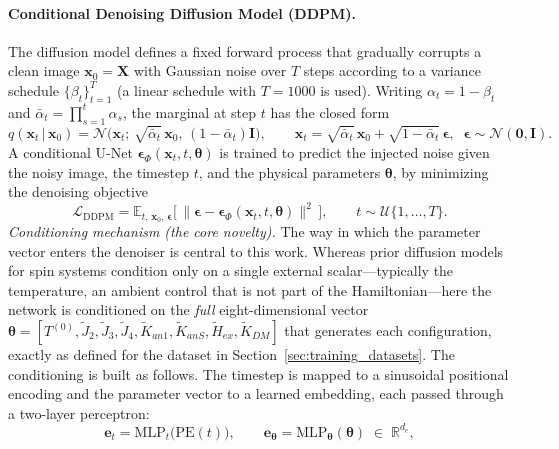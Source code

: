 \documentclass[letterpaper, 12, one column]{article}
\begin{document}
\paragraph{Conditional Denoising Diffusion Model (DDPM).}
The diffusion model defines a fixed forward process that gradually corrupts a clean image $\mathbf{x}_0=\mathbf{X}$ with Gaussian noise over $T$ steps according to a variance schedule $\{\beta_t\}_{t=1}^{T}$ (a linear schedule with $T=1000$ is used). Writing $\alpha_t = 1-\beta_t$ and $\bar{\alpha}_t = \prod_{s=1}^{t}\alpha_s$, the marginal at step $t$ has the closed form
\begin{equation}
q(\mathbf{x}_t\,|\,\mathbf{x}_0) = \mathcal{N}\!\big(\mathbf{x}_t;\,\sqrt{\bar{\alpha}_t}\,\mathbf{x}_0,\,(1-\bar{\alpha}_t)\mathbf{I}\big),\qquad
\mathbf{x}_t = \sqrt{\bar{\alpha}_t}\,\mathbf{x}_0 + \sqrt{1-\bar{\alpha}_t}\,\boldsymbol{\epsilon},\;\;\boldsymbol{\epsilon}\sim\mathcal{N}(\mathbf{0},\mathbf{I}).
\label{eq:ddpm_forward}
\end{equation}
A conditional U-Net $\boldsymbol{\epsilon}_{\Phi}(\mathbf{x}_t,t,\boldsymbol{\theta})$ is trained to predict the injected noise given the noisy image, the timestep $t$, and the physical parameters $\boldsymbol{\theta}$, by minimizing the denoising objective
\begin{equation}
\mathcal{L}_{\mathrm{DDPM}} = \mathbb{E}_{t,\,\mathbf{x}_0,\,\boldsymbol{\epsilon}}\Big[\,\big\lVert \boldsymbol{\epsilon} - \boldsymbol{\epsilon}_{\Phi}(\mathbf{x}_t,t,\boldsymbol{\theta})\big\rVert^2\,\Big],\qquad t\sim\mathcal{U}\{1,\dots,T\}.
\label{eq:ddpm_loss}
\end{equation}
\emph{Conditioning mechanism (the core novelty).} The way in which the parameter vector enters the denoiser is central to this work. Whereas prior diffusion models for spin systems condition only on a single external scalar---typically the temperature, an ambient control that is not part of the Hamiltonian---here the network is conditioned on the \emph{full} eight-dimensional vector $\boldsymbol{\theta}=[T^{(0)},\tilde{J}_2,\tilde{J}_3,\tilde{J}_4,\tilde{K}_{an1},\tilde{K}_{anS},\tilde{H}_{ex},\tilde{K}_{DM}]$ that generates each configuration, exactly as defined for the dataset in Section~\ref{sec:training_datasets}. The conditioning is built as follows. The timestep is mapped to a sinusoidal positional encoding and the parameter vector to a learned embedding, each passed through a two-layer perceptron:
\begin{equation}\label{eq:cond_embed}
\mathbf{e}_t = \mathrm{MLP}_t\big(\mathrm{PE}(t)\big),\qquad
\mathbf{e}_{\boldsymbol{\theta}} = \mathrm{MLP}_{\boldsymbol{\theta}}(\boldsymbol{\theta}) \;\in\; \mathbb{R}^{d_e},
\end{equation}
\end{document}
